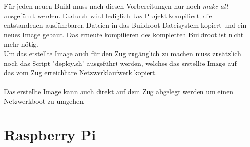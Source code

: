 Für jeden neuen Build muss nach diesen Vorbereitungen nur noch \textit{make all} ausgeführt werden. Dadurch wird lediglich das Projekt kompiliert, die entstandenen ausführbaren Dateien in das Buildroot Dateisystem kopiert und ein neues Image gebaut. Das erneute kompilieren des kompletten Buildroot ist nicht mehr nötig.\\
Um das erstellte Image auch für den Zug zugänglich zu machen muss zusätzlich noch das Script "deploy.sh" ausgeführt werden, welches das erstellte Image auf das vom Zug erreichbare Netzwerklaufwerk kopiert.\\\\
Das erstellte Image kann auch direkt auf dem Zug abgelegt werden um einen Netzwerkboot zu umgehen.

\section{Raspberry Pi}

